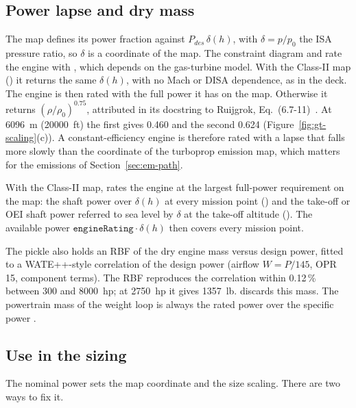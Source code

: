 \documentclass[a4paper,11pt]{article}
\begin{document}
\subsection{Power lapse and dry mass}\label{sec:gt-lapse}
The map defines its power fraction against $P_{des}\,\delta(h)$, with $\delta = p/p_0$ the ISA
pressure ratio, so $\delta$ is a coordinate of the map. The constraint diagram and
 rate the engine with , which depends on the
gas-turbine model. With the Class-II map () it returns the same
$\delta(h)$, with no Mach or DISA dependence, as in the deck. The engine is then rated with the
full power it has on the map. Otherwise it returns $(\rho/\rho_0)^{0.75}$, attributed in its
docstring to Ruijgrok, Eq.~(6.7-11)~\cite{ruijgrok}. At \SI{6096}{m} (\SI{20000}{ft}) the first
gives 0.460 and the second 0.624 (Figure~\ref{fig:gt-scaling}(c)). A constant-efficiency
engine is therefore rated with a lapse that falls more slowly than the coordinate of the
turboprop emission map, which matters for the emissions of Section~\ref{sec:em-path}.

With the Class-II map,  rates the engine at the largest full-power
requirement on the map: the shaft power over $\delta(h)$ at every mission point
() and the take-off or OEI shaft power referred to sea level by
$\delta$ at the take-off altitude (). The available
power $\texttt{engineRating}\cdot\delta(h)$ then covers every mission point.

The pickle also holds an RBF of the dry engine mass versus design power, fitted to a WATE++-style
correlation of the design power (airflow $W = P/145$, OPR 15, component terms). The RBF
reproduces the correlation within 0.12\,\% between 300 and \SI{8000}{hp}; at \SI{2750}{hp} it
gives \SI{1357}{lb}.  discards this mass. The powertrain mass
of the weight loop is always the rated power over the specific power .

\subsection{Use in the sizing}\label{sec:gt-sizing}
The nominal power sets the map coordinate and the size scaling. There are two ways to fix it.
\end{document}
